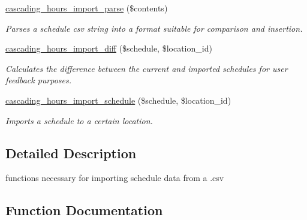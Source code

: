 \begin{DoxyCompactItemize}
\hyperlink{cascading__hours_8import_8php_af7a0e4a5b1480d92433e1c9ee1267859_af7a0e4a5b1480d92433e1c9ee1267859}{cascading\+\_\+hours\+\_\+import\+\_\+parse} (\$contents)
\begin{DoxyCompactList}\small\item\em Parses a schedule csv string into a format suitable for comparison and insertion. \end{DoxyCompactList}\item 
\hyperlink{cascading__hours_8import_8php_a9a7dae9ea96d27575e655699a5e89864_a9a7dae9ea96d27575e655699a5e89864}{cascading\+\_\+hours\+\_\+import\+\_\+diff} (\$schedule, \$location\+\_\+id)
\begin{DoxyCompactList}\small\item\em Calculates the difference between the current and imported schedules for user feedback purposes. \end{DoxyCompactList}\item 
\hyperlink{cascading__hours_8import_8php_a39f52134d819174065fe5f060295809a_a39f52134d819174065fe5f060295809a}{cascading\+\_\+hours\+\_\+import\+\_\+schedule} (\$schedule, \$location\+\_\+id)
\begin{DoxyCompactList}\small\item\em Imports a schedule to a certain location. \end{DoxyCompactList}\end{DoxyCompactItemize}


\subsection{Detailed Description}
functions necessary for importing schedule data from a .csv 



\subsection{Function Documentation}
\mbox{\label{cascading__hours_8import_8php_a9b40bb1438b71a75f27a70530506573e_a9b40bb1438b71a75f27a70530506573e}} 
